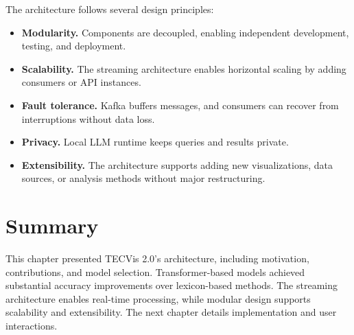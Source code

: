 The architecture follows several design principles:

\begin{itemize}
\item \textbf{Modularity.} Components are decoupled, enabling independent development, testing, and deployment.

\item \textbf{Scalability.} The streaming architecture enables horizontal scaling by adding consumers or API instances.

\item \textbf{Fault tolerance.} Kafka buffers messages, and consumers can recover from interruptions without data loss.

\item \textbf{Privacy.} Local LLM runtime keeps queries and results private.

\item \textbf{Extensibility.} The architecture supports adding new visualizations, data sources, or analysis methods without major restructuring.
\end{itemize}


\section{Summary}

This chapter presented TECVis 2.0's architecture, including motivation, contributions, and model selection. Transformer-based models achieved substantial accuracy improvements over lexicon-based methods. The streaming architecture enables real-time processing, while modular design supports scalability and extensibility. The next chapter details implementation and user interactions.

